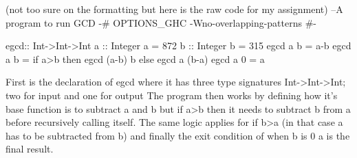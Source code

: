 (not too sure on the formatting but here is the raw code for my assignment)
--A program to run GCD
{-# OPTIONS_GHC -Wno-overlapping-patterns #-}

egcd:: Int->Int->Int 
a :: Integer
a = 872
b :: Integer
b = 315
egcd a b = a-b
egcd a b =
    if a>b
        then egcd (a-b) b
    else
       egcd a (b-a)
egcd a 0 = a
 
First is the declaration of egcd where it has three type signatures Int->Int->Int; two for input and one for output
The program then works by defining how it's base function is to subtract a and b but if a>b then it needs to subtract b from a before recursively calling itself. The same logic applies for if b>a (in that case a has to be subtracted from b) and finally the exit condition of when b is 0 a is the final result. 
